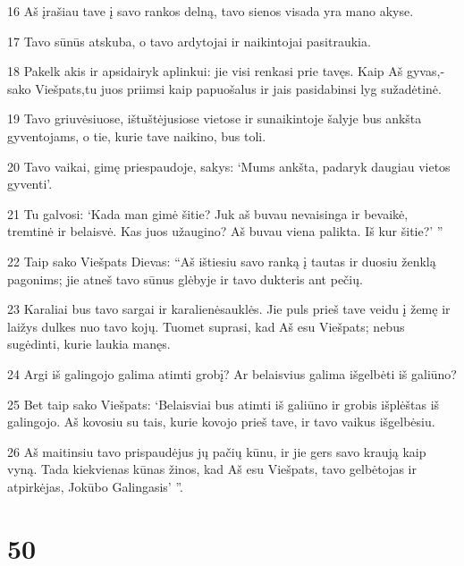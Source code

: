 \par 16 Aš įrašiau tave į savo rankos delną, tavo sienos visada yra mano akyse. 
\par 17 Tavo sūnūs atskuba, o tavo ardytojai ir naikintojai pasitraukia. 
\par 18 Pakelk akis ir apsidairyk aplinkui: jie visi renkasi prie tavęs. Kaip Aš gyvas,­sako Viešpats,­tu juos priimsi kaip papuošalus ir jais pasidabinsi lyg sužadėtinė. 
\par 19 Tavo griuvėsiuose, ištuštėjusiose vietose ir sunaikintoje šalyje bus ankšta gyventojams, o tie, kurie tave naikino, bus toli. 
\par 20 Tavo vaikai, gimę priespaudoje, sakys: ‘Mums ankšta, padaryk daugiau vietos gyventi’. 
\par 21 Tu galvosi: ‘Kada man gimė šitie? Juk aš buvau nevaisinga ir bevaikė, tremtinė ir belaisvė. Kas juos užaugino? Aš buvau viena palikta. Iš kur šitie?’ ” 
\par 22 Taip sako Viešpats Dievas: “Aš ištiesiu savo ranką į tautas ir duosiu ženklą pagonims; jie atneš tavo sūnus glėbyje ir tavo dukteris ant pečių. 
\par 23 Karaliai bus tavo sargai ir karalienės­auklės. Jie puls prieš tave veidu į žemę ir laižys dulkes nuo tavo kojų. Tuomet suprasi, kad Aš esu Viešpats; nebus sugėdinti, kurie laukia manęs. 
\par 24 Argi iš galingojo galima atimti grobį? Ar belaisvius galima išgelbėti iš galiūno? 
\par 25 Bet taip sako Viešpats: ‘Belaisviai bus atimti iš galiūno ir grobis išplėštas iš galingojo. Aš kovosiu su tais, kurie kovojo prieš tave, ir tavo vaikus išgelbėsiu. 
\par 26 Aš maitinsiu tavo prispaudėjus jų pačių kūnu, ir jie gers savo kraują kaip vyną. Tada kiekvienas kūnas žinos, kad Aš esu Viešpats, tavo gelbėtojas ir atpirkėjas, Jokūbo Galingasis’ ”.



\chapter{50}


